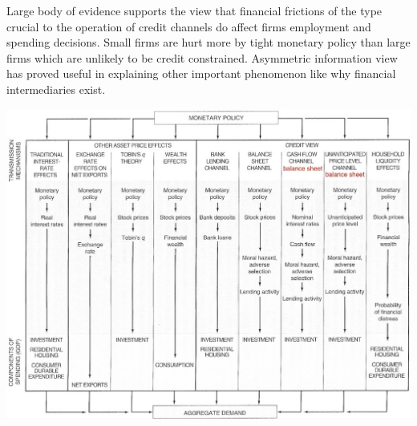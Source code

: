 \documentclass[12pt]{examnotes}
\begin{document}
 Large body of evidence supports the view that financial frictions of the type crucial to the operation of credit channels do affect firms employment and spending decisions.
 Small firms are hurt more by tight monetary policy than large firms which are unlikely to be credit constrained.
 Asymmetric information view has proved useful in explaining other important phenomenon like why financial intermediaries exist.

\vspace{6pt}
\includegraphics[scale=0.5]{./imgs/261.jpg}
\end{document}
